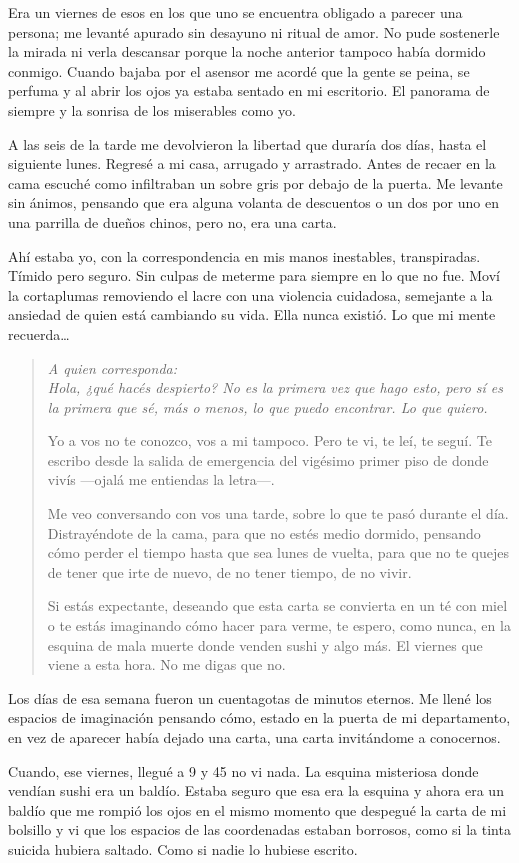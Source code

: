 
Era un viernes de esos en los que uno se encuentra obligado a parecer una
persona; me levanté apurado sin desayuno ni ritual de amor. No pude sostenerle 
la mirada ni verla descansar porque la noche anterior tampoco había dormido 
conmigo. Cuando bajaba por el asensor me acordé que la gente se peina, se perfuma
y al abrir los ojos ya estaba sentado en mi escritorio. El panorama
de siempre y la sonrisa de los miserables como yo.

A las seis de la tarde me devolvieron la libertad que duraría dos días, hasta
el siguiente lunes. Regresé a mi casa, arrugado y arrastrado.  Antes de recaer
en la cama escuché como infiltraban un sobre gris por debajo de la puerta. Me 
levante sin ánimos, pensando que era alguna volanta de descuentos o un dos por
uno en una parrilla de dueños chinos, pero no, era una carta.

Ahí estaba yo, con la correspondencia en mis manos inestables, transpiradas.
Tímido pero seguro. Sin culpas de meterme para siempre en lo que no fue. 
Moví la cortaplumas removiendo el lacre con una violencia cuidadosa,
semejante a la ansiedad de quien está cambiando su vida. Ella nunca existió.
Lo que mi mente recuerda\ldots\newline

\begin{quotation}
\itshape
\noindent
A quien corresponda:\\

Hola, ¿qué hacés despierto? No es la primera vez que hago esto, pero sí es la
primera que sé, más o menos, lo que puedo encontrar. Lo que quiero.

Yo a vos no te conozco, vos a mi tampoco. Pero te vi, te leí, te seguí. Te 
escribo desde la salida de emergencia del vigésimo primer piso de donde vivís
---ojalá me entiendas la letra---.

Me veo conversando con vos una tarde, sobre lo que te pasó durante el día. 
Distrayéndote de la cama, para que no estés medio dormido, pensando cómo perder
el tiempo hasta que sea lunes de vuelta, para que no te quejes de tener que
irte de nuevo, de no tener tiempo, de no vivir.

Si estás expectante, deseando que esta carta se convierta en un té con miel o
te estás imaginando cómo hacer para verme, te espero, como nunca, en la esquina
de mala muerte donde venden sushi y algo más. El viernes que viene a esta hora.
No me digas que no.
\end{quotation}

Los días de esa semana fueron un cuentagotas de minutos eternos. Me llené los
espacios de imaginación pensando cómo, estado en la puerta de mi departamento, 
en vez de aparecer había dejado una carta, una carta invitándome a conocernos.

Cuando, ese viernes, llegué a 9 y 45 no vi nada. La esquina misteriosa donde
vendían sushi era un baldío. Estaba seguro que esa era la esquina y ahora era
un baldío que me rompió los ojos en el mismo momento que despegué la carta de 
mi bolsillo y vi que los espacios de las coordenadas estaban borrosos, como si
la tinta suicida hubiera saltado. Como si nadie lo hubiese escrito.

